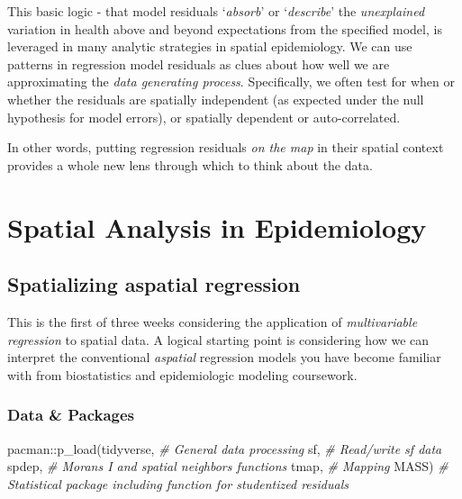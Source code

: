 \documentclass[
]{book}
\newenvironment{Shaded}{\begin{snugshade}}{\end{snugshade}}
\newcommand{\CommentTok}[1]{\textcolor[rgb]{0.56,0.35,0.01}{\textit{#1}}}
\newcommand{\FunctionTok}[1]{\textcolor[rgb]{0.00,0.00,0.00}{#1}}
\newcommand{\NormalTok}[1]{#1}
\newcommand{\SpecialCharTok}[1]{\textcolor[rgb]{0.00,0.00,0.00}{#1}}
\begin{document}
This basic logic - that model residuals `\emph{absorb}' or `\emph{describe}' the \emph{unexplained} variation in health above and beyond expectations from the specified model, is leveraged in many analytic strategies in spatial epidemiology. We can use patterns in regression model residuals as clues about how well we are approximating the \emph{data generating process}. Specifically, we often test for when or whether the residuals are spatially independent (as expected under the null hypothesis for model errors), or spatially dependent or auto-correlated.

In other words, putting regression residuals \emph{on the map} in their spatial context provides a whole new lens through which to think about the data.

\hypertarget{spatial-analysis-in-epidemiology-6}{%
\section{Spatial Analysis in Epidemiology}\label{spatial-analysis-in-epidemiology-6}}

\hypertarget{spatializing-aspatial-regression}{%
\subsection{Spatializing aspatial regression}\label{spatializing-aspatial-regression}}

This is the first of three weeks considering the application of \emph{multivariable regression} to spatial data. A logical starting point is considering how we can interpret the conventional \emph{aspatial} regression models you have become familiar with from biostatistics and epidemiologic modeling coursework.

\hypertarget{data-packages}{%
\subsubsection{Data \& Packages}\label{data-packages}}

\begin{Shaded}
\begin{Highlighting}[]
\NormalTok{pacman}\SpecialCharTok{::}\FunctionTok{p\_load}\NormalTok{(tidyverse, }\CommentTok{\# General data processing}
\NormalTok{               sf,        }\CommentTok{\# Read/write sf data}
\NormalTok{               spdep,     }\CommentTok{\# Moran\textquotesingle{}s I and spatial neighbors functions}
\NormalTok{               tmap,      }\CommentTok{\# Mapping}
\NormalTok{               MASS)      }\CommentTok{\# Statistical package including function for studentized residuals}
\end{Highlighting}
\end{Shaded}
\end{document}

